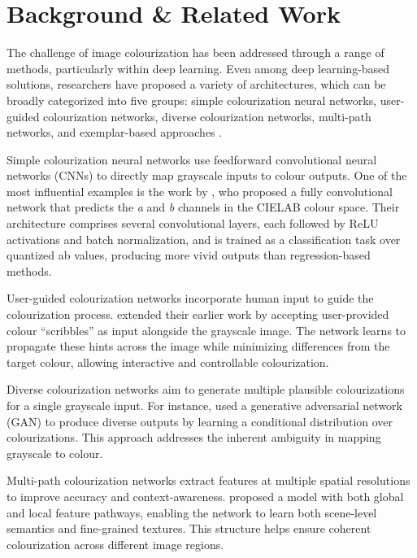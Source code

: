 \documentclass{article} %
\begin{document}
\section{Background \& Related Work}

The challenge of image colourization has been addressed through a range of methods, particularly within deep learning. Even among deep learning-based solutions, researchers 
have proposed a variety of architectures, which can be broadly categorized into five groups: simple colourization neural networks, user-guided colourization networks, diverse 
colourization networks, multi-path networks, and exemplar-based approaches \citep{zeger2021grayscale}.

Simple colourization neural networks use feedforward convolutional neural networks (CNNs) to directly map grayscale inputs to colour outputs. One of the most influential examples 
is the work by \citet{zhang2016colorful}, who proposed a fully convolutional network that predicts the \textit{a} and \textit{b} channels in the CIELAB colour space. Their 
architecture comprises several convolutional layers, each followed by ReLU activations and batch normalization, and is trained as a classification task over quantized ab values, 
producing more vivid outputs than regression-based methods.

User-guided colourization networks incorporate human input to guide the colourization process. \citet{zhang2017real} extended their earlier work by accepting user-provided colour 
“scribbles” as input alongside the grayscale image. The network learns to propagate these hints across the image while minimizing differences from the target colour, allowing 
interactive and controllable colourization.

Diverse colourization networks aim to generate multiple plausible colourizations for a single grayscale input. For instance, \citet{Vitoria2020ChromaGAN} used a generative adversarial 
network (GAN) to produce diverse outputs by learning a conditional distribution over colourizations. This approach addresses the inherent ambiguity in mapping grayscale to colour.

Multi-path colourization networks extract features at multiple spatial resolutions to improve accuracy and context-awareness. \citet{Iizuka2016Colourization} proposed a model with both 
global and local feature pathways, enabling the network to learn both scene-level semantics and fine-grained textures. This structure helps ensure coherent colourization across different 
image regions.
\end{document}
